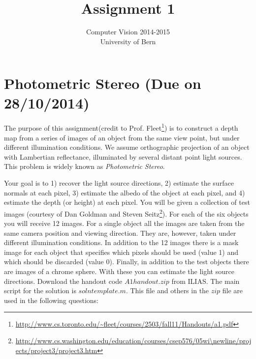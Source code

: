 \documentclass{paper}
\title{Assignment 1}
\author{Computer Vision 2014-2015\\University of Bern}
\begin{document}
\maketitle

%

\section{Photometric Stereo (Due on 28/10/2014)}

The purpose of this assignment(credit to Prof. Fleet\footnote{\url{http://www.cs.toronto.edu/~fleet/courses/2503/fall11/Handouts/a1.pdf}}) is to construct a depth map from a series of images of an object from the same view point, but under different illumination conditions. We assume orthographic projection of an object with Lambertian reflectance, illuminated by several distant point light sources. This problem is widely known as \textit{Photometric Stereo}.

Your goal is to 1) recover the light source directions, 2) estimate the surface normals at each pixel, 3) estimate the albedo of the object at each pixel, and 4) estimate the depth (or height) at each pixel. You will be given a collection of test images (courtesy of Dan Goldman and Steven Seitz\footnote{\url{http://www.cs.washington.edu/education/courses/csep576/05wi\newline/projects/project3/project3.htm}}). For each of the six objects you will receive 12 images. For a single object all the images are taken from the same camera position and viewing direction. They are, however, taken under different illumination conditions. In addition to the 12 images there is a mask image for each object that specifies which pixels should be used (value 1) and which should be discarded (value 0). Finally, in addition to the test objects there are images of a chrome sphere. With these you can estimate the light source directions. Download the handout code $A1handout.zip$ from ILIAS. The main script for the solution is $solntemplate.m$. This file and others in the $zip$ file are used in the following questions:
\end{document}
